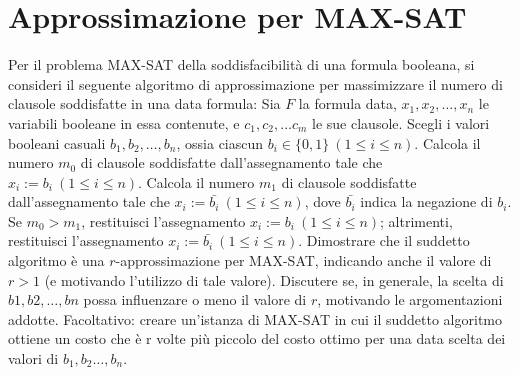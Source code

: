 \chapter{Approssimazione per MAX-SAT}

\begin{problem*}
    Per il problema MAX-SAT della soddisfacibilità di una formula 
    booleana, si consideri il seguente algoritmo di approssimazione 
    per massimizzare il numero di clausole soddisfatte in una data 
    formula: Sia $F$ la formula data, $x_1 , x_2 , \dots , x_n$ le
    variabili booleane in essa contenute, e $c_1 , c_2 , \dots c_m$
    le sue clausole. Scegli i valori booleani casuali $b_1 , b_2 , 
    \dots, b_n$, ossia ciascun $b_i \in \{0, 1\}~(1 \le i \le n)$. 
    Calcola il numero $m_0$ di clausole soddisfatte dall’assegnamento 
    tale che $x_i := b_i~ (1 \le i \le n)$. Calcola il numero $m_1$ di
    clausole soddisfatte dall’assegnamento tale che $x_i := \bar{b_i}~
    (1 \le i \le n)$, dove $\bar{b_i}$ indica la negazione di $b_i$. 
    Se $m_0 > m_1$, restituisci l’assegnamento $x_i := b_i ~(1 \le i 
    \le n)$; altrimenti, restituisci l’assegnamento $x_i := \bar{b_i} 
    ~(1 \le i \le n)$. Dimostrare che il suddetto algoritmo è una 
    $r$-approssimazione per MAX-SAT, indicando anche il valore di $r > 1$
    (e motivando l’utilizzo di tale valore). Discutere se, in generale, 
    la scelta di $b1 , b2 , \dots , bn$ possa influenzare o meno il valore 
    di $r$, motivando le argomentazioni addotte. Facoltativo: creare 
    un’istanza di MAX-SAT in cui il suddetto algoritmo ottiene un costo che 
    è r volte più piccolo del costo ottimo per una data scelta dei valori 
    di $b_1 , b_2 \dots , b_n$.
\end{problem*} 
